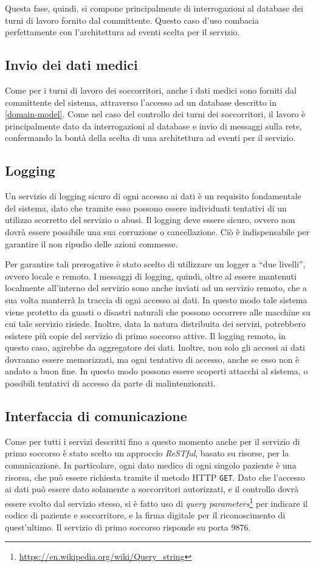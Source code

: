 \documentclass[a4paper,12pt]{report}
\begin{document}
Questa fase, quindi, si compone principalmente di interrogazioni al database dei turni di lavoro fornito dal committente. Questo caso d'uso combacia perfettamente con l'architettura ad eventi scelta per il servizio. 
\subsection{Invio dei dati medici}
Come per i turni di lavoro dei soccorritori, anche i dati medici sono forniti dal committente del sistema, attraverso l'accesso ad un database descritto in \autoref{domain-model}. Come nel caso del controllo dei turni dei soccorritori, il lavoro è principalmente dato da interrogazioni al database e invio di messaggi sulla rete, confermando la bontà della scelta di una architettura ad eventi per il servizio. 
\subsection{Logging}
Un servizio di logging sicuro di ogni accesso ai dati è un requisito fondamentale del sistema, dato che tramite esso possono essere individuati tentativi di un utilizzo scorretto del servizio o abusi. Il logging deve essere sicuro, ovvero non dovrà essere possibile una sua corruzione o cancellazione. Ciò è indispensabile per garantire il non ripudio delle azioni commesse. 

Per garantire tali prerogative è stato scelto di utilizzare un logger a ``due livelli'', ovvero locale e remoto. I messaggi di logging, quindi, oltre al essere mantenuti localmente all'interno del servizio sono anche inviati ad un servizio remoto, che a sua volta manterrà la traccia di ogni accesso ai dati. In questo modo tale sistema viene protetto da guasti o disastri naturali che possono occorrere alle macchine su cui tale servizio risiede. Inoltre, data la natura distribuita dei servizi, potrebbero esistere più copie del servizio di primo soccorso attive. Il logging remoto, in questo caso, agirebbe da aggregatore dei dati. Inoltre, non solo gli accessi ai dati dovranno essere memorizzati, ma ogni tentativo di accesso, anche se esso non è andato a buon fine. In questo modo possono essere scoperti attacchi al sistema, o possibili tentativi di accesso da parte di malintenzionati. 
\subsection{Interfaccia di comunicazione} \label{firstAidCom}
Come per tutti i servizi descritti fino a questo momento anche per il servizio di primo soccorso è stato scelto un approccio \emph{ReSTful}, basato su risorse, per la comunicazione. In particolare, ogni dato medico di ogni singolo paziente è una risorsa, che può essere richiesta tramite il metodo HTTP \texttt{GET}. Dato che l'accesso ai dati può essere dato solamente a soccorritori autorizzati, e il controllo dovrà essere svolto dal servizio stesso, si è fatto uso di \emph{query parameters}\footnote{\url{https://en.wikipedia.org/wiki/Query_string}} per indicare il codice di paziente e soccorritore, e la firma digitale per il riconoscimento di quest'ultimo. Il servizio di primo soccorso risponde su porta 9876.
\end{document}
